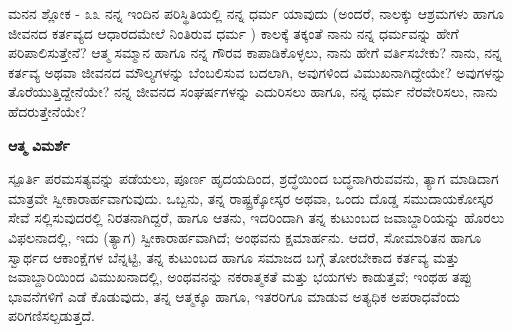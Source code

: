 \begin{mananam}{\mananamfont \large ಮನನ ಶ್ಲೋಕ - ೩೩}
\footnotesize \mananamtext ನನ್ನ ಇಂದಿನ ಪರಿಸ್ಥಿತಿಯಲ್ಲಿ ನನ್ನ ಧರ್ಮ ಯಾವುದು (ಅಂದರೆ, ನಾಲಕ್ಕು ಆಶ್ರಮಗಳು ಹಾಗೂ ಜೀವನದ ಕರ್ತವ್ಯದ ಆಧಾರದಮೇಲೆ ನಿಂತಿರುವ ಧರ್ಮ ) ಕಾಲಕ್ಕೆ ತಕ್ಕಂತೆ ನಾನು ನನ್ನ ಧರ್ಮವನ್ನು ಹೇಗೆ ಪರಿಪಾಲಿಸುತ್ತೇನೆ? ಆತ್ಮ ಸಮ್ಮಾನ ಹಾಗೂ ನನ್ನ ಗೌರವ ಕಾಪಾಡಿಕೊಳ್ಳಲು, ನಾನು ಹೇಗೆ ವರ್ತಿಸಬೇಕು? ನಾನು, ನನ್ನ ಕರ್ತವ್ಯ ಅಥವಾ ಜೀವನದ ಮೌಲ್ಯಗಳನ್ನು ಬೆಂಬಲಿಸುವ ಬದಲಾಗಿ, ಅವುಗಳಿಂದ ವಿಮುಖನಾಗಿದ್ದೇಯೇ? ಅವುಗಳನ್ನು ತೊರೆಯುತ್ತಿದ್ದೇನೆಯೇ? ನನ್ನ ಜೀವನದ ಸಂಘರ್ಷಗಳನ್ನು ಎದುರಿಸಲು ಹಾಗೂ, ನನ್ನ ಧರ್ಮ ನೆರವೇರಿಸಲು, ನಾನು ಹೆದರುತ್ತೇನೆಯೇ?
\end{mananam}
\WritingHand\enspace\textbf{ಆತ್ಮ ವಿಮರ್ಶೆ}
\begin{inspiration}{\mananamfont \large ಸ್ಪೂರ್ತಿ}
\ssmall \mananamtext ಪರಮಸತ್ಯವನ್ನು ಪಡೆಯಲು, ಪೂರ್ಣ ಹೃದಯದಿಂದ, ಶ್ರದ್ಧೆಯಿಂದ ಬದ್ಧನಾಗಿರುವವನು, ತ್ಯಾಗ ಮಾಡಿದಾಗ ಮಾತ್ರವೇ ಸ್ವೀಕಾರಾರ್ಹವಾಗುವುದು. ಒಬ್ಬನು, ತನ್ನ ರಾಷ್ಟ್ರಕ್ಕೋಸ್ಕರ ಅಥವಾ, ಒಂದು ದೊಡ್ಡ ಸಮುದಾಯಕೋಸ್ಕರ ಸೇವೆ ಸಲ್ಲಿಸುವುದರಲ್ಲಿ ನಿರತನಾಗಿದ್ದರೆ, ಹಾಗೂ ಆತನು, ಇದರಿಂದಾಗಿ ತನ್ನ ಕುಟುಂಬದ ಜವಾಬ್ದಾರಿಯನ್ನು ಹೊರಲು ವಿಫಲನಾದಲ್ಲಿ, ಇದು (ತ್ಯಾಗ) ಸ್ವೀಕಾರಾರ್ಹವಾಗಿದೆ; ಅಂಥವನು ಕ್ಷಮಾರ್ಹನು. ಆದರೆ, ಸೋಮಾರಿತನ ಹಾಗೂ ಸ್ವಾರ್ಥದ ಆಕಾಂಕ್ಷೆಗಳ ಬೆನ್ನಟ್ಟಿ, ತನ್ನ ಕುಟುಂಬದ ಹಾಗೂ ಸಮಾಜದ ಬಗ್ಗೆ ತೋರಬೇಕಾದ ಕರ್ತವ್ಯ  ಮತ್ತು ಜವಾಬ್ದಾರಿಯಿಂದ ವಿಮುಖನಾದಲ್ಲಿ, ಅಂಥವನನ್ನು ನಕರಾತ್ಮಕತೆ ಮತ್ತು ಭಯಗಳು ಕಾಡುತ್ತವೆ; ಇಂಥಹ ತಪ್ಪು ಭಾವನೆಗಳಿಗೆ ಎಡೆ ಕೊಡುವುದು, ತನ್ನ ಆತ್ಮಕ್ಕೂ ಹಾಗೂ, ಇತರರಿಗೂ ಮಾಡುವ ಅತ್ಯಧಿಕ ಅಪರಾಧವೆಂದು ಪರಿಗಣಿಸಲ್ಪಡುತ್ತದೆ. 
\end{inspiration}
\newpage

